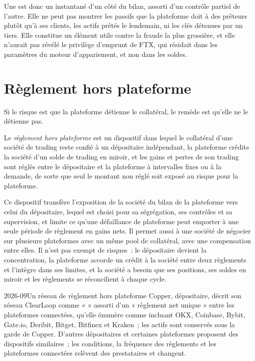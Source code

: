 Une  est donc un instantané d'un côté du bilan, assorti d'un contrôle partiel de l'autre.
Elle ne peut pas montrer les passifs que la plateforme doit à des prêteurs plutôt qu'à ses clients, les actifs prêtés le
lendemain, ni les clés détenues par un tiers. Elle constitue un élément utile contre la fraude la plus grossière, et elle n'aurait pas
révélé le privilège d'emprunt de FTX, qui résidait dans les paramètres du moteur d'appariement, et non
dans les soldes.

\section{Règlement hors plateforme}

Si le risque est que la plateforme détienne le collatéral, le remède est qu'elle ne le détienne pas.

\begin{definition}\label{def:m3:centralised-exchanges:oes}
Le \emph{règlement hors plateforme} est un dispositif dans lequel le collatéral d'une société de trading
reste confié à un dépositaire indépendant, la plateforme crédite la société d'un solde de trading en miroir,
et les gains et pertes de son trading sont réglés entre le dépositaire et la plateforme à intervalles fixes ou à la demande, de sorte que
seul le montant non réglé soit exposé au risque pour la plateforme.
\end{definition}

Ce dispositif transfère l'exposition de la société du bilan de la plateforme vers celui du dépositaire, lequel est
choisi pour sa ségrégation, ses contrôles et sa supervision, et limite ce qu'une défaillance de plateforme peut emporter à
une seule période de règlement en gains nets. Il permet aussi à une société de négocier sur plusieurs plateformes avec un même pool de collatéral,
avec une compensation entre elles. Il n'est pas exempt de risques~: le dépositaire devient la concentration, la plateforme accorde
un crédit à la société entre deux règlements et l'intègre dans ses limites, et la société a besoin que ses
positions, ses soldes en miroir et les règlements se réconcilient à chaque cycle.

\begin{dated}{2026-09}{Un réseau de règlement hors plateforme}\label{dat:m3:centralised-exchanges:clearloop}
Copper, dépositaire, décrit son réseau ClearLoop comme «  » assorti d'un « règlement net
unique » entre les plateformes connectées, qu'elle énumère comme incluant OKX, Coinbase, Bybit, Gate.io, Deribit,
Bitget, Bitfinex et Kraken~; les actifs sont conservés sous la garde de Copper. D'autres dépositaires et certaines plateformes proposent
des dispositifs similaires~; les conditions, la fréquence des règlements et les plateformes connectées relèvent des prestataires et changent.
\end{dated}

